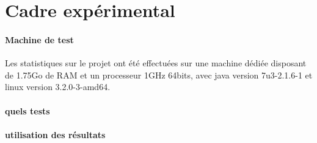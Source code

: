 \section{Cadre expérimental}

	\paragraph{Machine de test}
		Les statistiques sur le projet ont été effectuées sur une machine
		dédiée disposant de 1.75Go de RAM et un processeur 1GHz 64bits,
		avec java version 7u3-2.1.6-1 et linux version 3.2.0-3-amd64.

	\paragraph{quels tests}

	\paragraph{utilisation des résultats}

